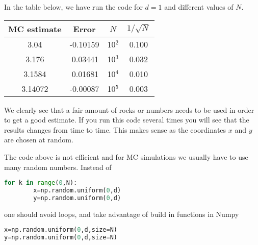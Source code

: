 \documentclass[graybox,sectrefs,envcountresetchap,open=right,final]{svmonodo}
\newenvironment{graybox2admon}[1][]{
\begin{graybox2mdframed}[frametitle=#1]
}
{
\end{graybox2mdframed}
}
\begin{document}
In the table below, we have run the code for $d=1$ and different values of $N$. 



{\small   %

\vspace{4mm}

\begin{tabular}{cccc}
\hline
\multicolumn{1}{c}{ MC estimate } & \multicolumn{1}{c}{ Error } & \multicolumn{1}{c}{ $N$ } & \multicolumn{1}{c}{ $1/\sqrt{N}$ } \\
\hline
3.04        & -0.10159    & 10$^2$ & 0.100        \\
3.176       & $\,$0.03441 & 10$^3$ & 0.032        \\
3.1584      & $\,$0.01681 & 10$^4$ & 0.010        \\
3.14072     & -0.00087    & 10$^5$ & 0.003        \\
\hline
\end{tabular}

\vspace{4mm}

}


\noindent
We clearly see that a fair amount of rocks or numbers needs to be used in order to get a good estimate. If you run this code several
times you will see that the results changes from time to time. This
makes sense as the coordinates $x$ and $y$ are chosen at random.



\begin{graybox2admon}[A note on performance]
The code above is not efficient and for MC simulations we usually have to use many random numbers. Instead of




\begin{lstlisting}[language=python,style=blue1bar]
for k in range(0,N):
        x=np.random.uniform(0,d)
        y=np.random.uniform(0,d)

\end{lstlisting}

one should avoid loops, and take advantage of build in functions in Numpy



\begin{lstlisting}[language=python,style=blue1bar]
x=np.random.uniform(0,d,size=N)
y=np.random.uniform(0,d,size=N)

\end{lstlisting}
\end{graybox2admon}
\end{document}
